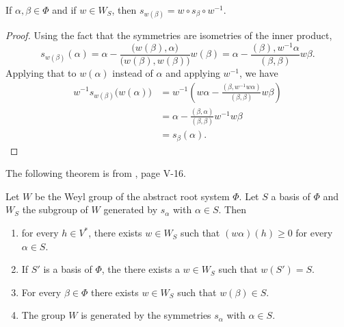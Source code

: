 \begin{lemma}\label{Lemswwsbwemucirc}
    If \( \alpha,\beta\in\Phi\) and if \( w\in W_S\), then \( s_{w(\beta)}=w\circ s_{\beta}\circ w^{-1}\).
\end{lemma}

\begin{proof}
    Using the fact that the symmetries are isometries of the inner product,
    \begin{equation}
        s_{w(\beta)}(\alpha)=\alpha-\frac{ \big( w(\beta),\alpha \big) }{ \big( w(\beta),w(\beta) \big) }w(\beta)=\alpha-\frac{ (\beta),w^{-1}\alpha }{ (\beta,\beta) }w\beta.
    \end{equation}
    Applying that to \( w(\alpha)\) instead of \( \alpha\) and applying \( w^{-1}\), we have
    \begin{subequations}
        \begin{align}
            w^{-1}s_{w(\beta)}\big(w(\alpha)\big)&=w^{-1}\left( w\alpha-\frac{ (\beta,w^{-1}w\alpha) }{ (\beta,\beta) }w\beta \right)\\
            &=\alpha-\frac{ (\beta,\alpha) }{ (\beta,\beta) }w^{-1}w\beta\\
            &=s_{\beta}(\alpha).
        \end{align}
    \end{subequations}
\end{proof}

The following theorem is from \cite{SerreSSAlgebres}, page V-16.
\begin{theorem}     \label{ThoWeylGenere}
    Let \( W\) be the Weyl group of the abstract root system \( \Phi\). Let \( S\) a basis of \( \Phi\) and \( W_S\) the subgroup of \( W\) generated by \( s_{\alpha}\) with \(\alpha\in S\). Then
    \begin{enumerate}
        \item   \label{ItemThoWeylGenerei}
            for every \( h\in V^*\), there exists \( w\in W_S\) such that \( (w\alpha)(h)\geq 0\) for every \( \alpha\in S\).
        \item   \label{ItemThoWeylGenereii}
            If \( S'\) is a basis of \( \Phi\), the there exists a \( w\in W_S\) such that \( w(S')=S\).
        \item\label{ItemThoWeylGenereiii}
            For every \( \beta\in\Phi\) there exists \( w\in W_S\) such that \( w(\beta)\in S\).
        \item\label{ItemThoWeylGenereiv}
            The group \( W\) is generated by the symmetries \( s_{\alpha}\) with \( \alpha\in S\).
    \end{enumerate}
\end{theorem}

